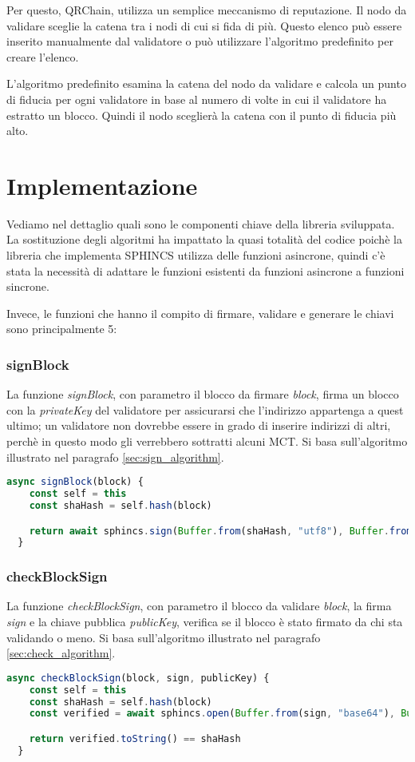 Per questo, QRChain, utilizza un semplice meccanismo di reputazione. Il nodo da validare sceglie la catena tra i nodi di cui si fida di più. Questo elenco può essere inserito manualmente dal validatore o può utilizzare l'algoritmo predefinito per creare l'elenco.

L'algoritmo predefinito esamina la catena del nodo da validare e calcola un punto di fiducia per ogni validatore in base al numero di volte in cui il validatore ha estratto un blocco.
Quindi il nodo sceglierà la catena con il punto di fiducia più alto.

\section{Implementazione}
Vediamo nel dettaglio quali sono le componenti chiave della libreria sviluppata. La sostituzione degli algoritmi ha impattato la quasi totalità del codice poichè la libreria che implementa SPHINCS utilizza delle funzioni asincrone, quindi c'è stata la necessità di adattare le funzioni esistenti da funzioni asincrone a funzioni sincrone.

Invece, le funzioni che hanno il compito di firmare, validare e generare le chiavi sono principalmente 5:

\subsubsection{signBlock}
La funzione \textit{signBlock}, con parametro il blocco da firmare \textit{block}, firma un blocco con la \textit{privateKey} del validatore per assicurarsi che l'indirizzo appartenga a quest ultimo; un validatore non dovrebbe essere in grado di inserire indirizzi di altri, perchè in questo modo gli verrebbero sottratti alcuni MCT. Si basa sull'algoritmo illustrato nel paragrafo \ref{sec:sign_algorithm}.
\\
\begin{lstlisting}[language=JavaScript,breaklines]
  async signBlock(block) {
    const self = this
    const shaHash = self.hash(block)

    return await sphincs.sign(Buffer.from(shaHash, "utf8"), Buffer.from(self.validator.privateKey, 'hex'))
  }
\end{lstlisting}

\subsubsection{checkBlockSign}
La funzione \textit{checkBlockSign}, con parametro il blocco da validare \textit{block}, la firma \textit{sign} e la chiave pubblica \textit{publicKey}, verifica se il blocco è stato firmato da chi sta validando o meno. Si basa sull'algoritmo illustrato nel paragrafo \ref{sec:check_algorithm}.
\\
\begin{lstlisting}[language=JavaScript,breaklines]
  async checkBlockSign(block, sign, publicKey) {
    const self = this
    const shaHash = self.hash(block)
    const verified = await sphincs.open(Buffer.from(sign, "base64"), Buffer.from(publicKey, 'hex'));

    return verified.toString() == shaHash
  }
\end{lstlisting}

